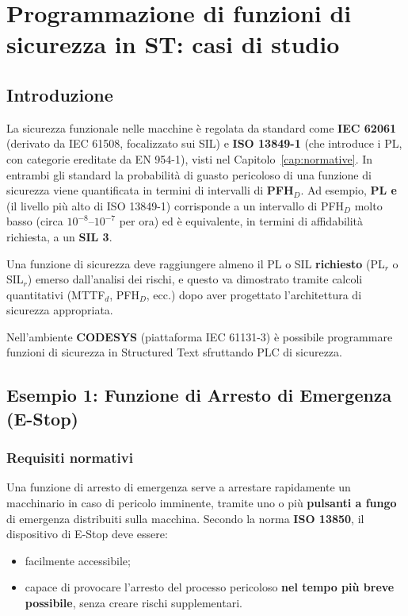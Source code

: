 \chapter{Programmazione di funzioni di sicurezza in ST: casi di studio}
\label{cap:safe-plc}

\section{Introduzione}
La sicurezza funzionale nelle macchine è regolata da standard come \textbf{IEC 62061} (derivato da IEC 61508, focalizzato sui SIL) e \textbf{ISO 13849-1} (che introduce i PL, con categorie ereditate da EN 954-1), visti nel Capitolo~\ref{cap:normative}. In entrambi gli standard la probabilità di guasto pericoloso di una funzione di sicurezza viene quantificata in termini di intervalli di \textbf{PFH$_D$}. Ad esempio, \textbf{PL e} (il livello più alto di ISO 13849-1) corrisponde a un intervallo di PFH$_D$ molto basso (circa $10^{-8}$--$10^{-7}$ per ora) ed è equivalente, in termini di affidabilità richiesta, a un \textbf{SIL 3}.

Una funzione di sicurezza deve raggiungere almeno il PL o SIL \textbf{richiesto} (PL$_r$ o SIL$_r$) emerso dall'analisi dei rischi, e questo va dimostrato tramite calcoli quantitativi (MTTF$_d$, PFH$_D$, ecc.) dopo aver progettato l'architettura di sicurezza appropriata.

Nell'ambiente \textbf{CODESYS} (piattaforma IEC 61131-3) è possibile programmare funzioni di sicurezza in Structured Text sfruttando PLC di sicurezza.

\section{Esempio 1: Funzione di Arresto di Emergenza (E-Stop)}
\subsection{Requisiti normativi}
Una funzione di arresto di emergenza serve a arrestare rapidamente un macchinario in caso di pericolo imminente, tramite uno o più \textbf{pulsanti a fungo} di emergenza distribuiti sulla macchina. Secondo la norma \textbf{ISO 13850}, il dispositivo di E-Stop deve essere:
\begin{itemize}
    \item facilmente accessibile;
    \item capace di provocare l'arresto del processo pericoloso \textbf{nel tempo più breve possibile}, senza creare rischi supplementari.
\end{itemize}

